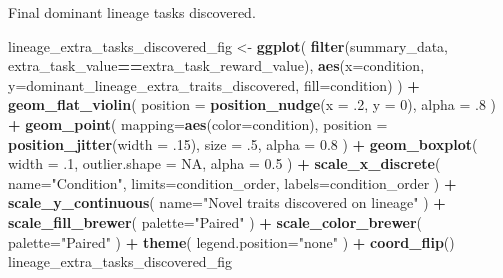 \documentclass[]{book}
\newenvironment{Shaded}{\begin{snugshade}}{\end{snugshade}}
\newcommand{\DataTypeTok}[1]{\textcolor[rgb]{0.13,0.29,0.53}{#1}}
\newcommand{\DecValTok}[1]{\textcolor[rgb]{0.00,0.00,0.81}{#1}}
\newcommand{\FloatTok}[1]{\textcolor[rgb]{0.00,0.00,0.81}{#1}}
\newcommand{\KeywordTok}[1]{\textcolor[rgb]{0.13,0.29,0.53}{\textbf{#1}}}
\newcommand{\NormalTok}[1]{#1}
\newcommand{\OperatorTok}[1]{\textcolor[rgb]{0.81,0.36,0.00}{\textbf{#1}}}
\newcommand{\OtherTok}[1]{\textcolor[rgb]{0.56,0.35,0.01}{#1}}
\newcommand{\StringTok}[1]{\textcolor[rgb]{0.31,0.60,0.02}{#1}}
\begin{document}
Final dominant lineage tasks discovered.

\begin{Shaded}
\begin{Highlighting}[]
\NormalTok{lineage_extra_tasks_discovered_fig <-}\StringTok{ }\KeywordTok{ggplot}\NormalTok{(}
    \KeywordTok{filter}\NormalTok{(summary_data, extra_task_value}\OperatorTok{==}\NormalTok{extra_task_reward_value),}
    \KeywordTok{aes}\NormalTok{(}\DataTypeTok{x=}\NormalTok{condition, }\DataTypeTok{y=}\NormalTok{dominant_lineage_extra_traits_discovered, }\DataTypeTok{fill=}\NormalTok{condition)}
\NormalTok{  ) }\OperatorTok{+}
\StringTok{  }\KeywordTok{geom_flat_violin}\NormalTok{(}
    \DataTypeTok{position =} \KeywordTok{position_nudge}\NormalTok{(}\DataTypeTok{x =} \FloatTok{.2}\NormalTok{, }\DataTypeTok{y =} \DecValTok{0}\NormalTok{),}
    \DataTypeTok{alpha =} \FloatTok{.8}
\NormalTok{  ) }\OperatorTok{+}
\StringTok{  }\KeywordTok{geom_point}\NormalTok{(}
    \DataTypeTok{mapping=}\KeywordTok{aes}\NormalTok{(}\DataTypeTok{color=}\NormalTok{condition),}
    \DataTypeTok{position =} \KeywordTok{position_jitter}\NormalTok{(}\DataTypeTok{width =} \FloatTok{.15}\NormalTok{),}
    \DataTypeTok{size =} \FloatTok{.5}\NormalTok{,}
    \DataTypeTok{alpha =} \FloatTok{0.8}
\NormalTok{  ) }\OperatorTok{+}
\StringTok{  }\KeywordTok{geom_boxplot}\NormalTok{(}
    \DataTypeTok{width =} \FloatTok{.1}\NormalTok{,}
    \DataTypeTok{outlier.shape =} \OtherTok{NA}\NormalTok{,}
    \DataTypeTok{alpha =} \FloatTok{0.5}
\NormalTok{  ) }\OperatorTok{+}
\StringTok{  }\KeywordTok{scale_x_discrete}\NormalTok{(}
    \DataTypeTok{name=}\StringTok{"Condition"}\NormalTok{,}
    \DataTypeTok{limits=}\NormalTok{condition_order,}
    \DataTypeTok{labels=}\NormalTok{condition_order}
\NormalTok{  ) }\OperatorTok{+}
\StringTok{  }\KeywordTok{scale_y_continuous}\NormalTok{(}
    \DataTypeTok{name=}\StringTok{"Novel traits discovered on lineage"}
\NormalTok{  ) }\OperatorTok{+}
\StringTok{  }\KeywordTok{scale_fill_brewer}\NormalTok{(}
    \DataTypeTok{palette=}\StringTok{"Paired"}
\NormalTok{  ) }\OperatorTok{+}
\StringTok{  }\KeywordTok{scale_color_brewer}\NormalTok{(}
    \DataTypeTok{palette=}\StringTok{"Paired"}
\NormalTok{  ) }\OperatorTok{+}
\StringTok{  }\KeywordTok{theme}\NormalTok{(}
    \DataTypeTok{legend.position=}\StringTok{"none"}
\NormalTok{  ) }\OperatorTok{+}
\StringTok{  }\KeywordTok{coord_flip}\NormalTok{()}
\NormalTok{lineage_extra_tasks_discovered_fig}
\end{Highlighting}
\end{Shaded}
\end{document}
